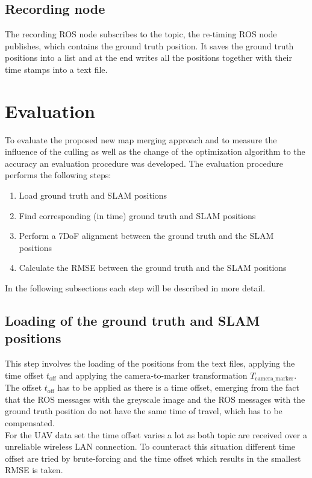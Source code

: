 \subsection{Recording node}
\label{subsec:record_node}
The recording \ac{ROS} node subscribes to the topic, the re-timing \ac{ROS} node publishes, which contains the ground truth position. It saves the ground truth positions into a list and at the end writes all the positions together with their time stamps into a text file.

\section{Evaluation}
To evaluate the proposed new map merging approach and to measure the influence of the culling as well as the change of the optimization algorithm to the accuracy an evaluation procedure was developed. The evaluation procedure performs the following steps:

\begin{enumerate}
  \item Load ground truth and \ac{SLAM} positions
  \item Find corresponding (in time) ground truth and \ac{SLAM} positions
  \item Perform a 7DoF alignment between the ground truth and the \ac{SLAM} positions
  \item Calculate the \acf{RMSE} between the ground truth and the \ac{SLAM} positions
\end{enumerate}

In the following subsections each step will be described in more detail.

\subsection{Loading of the ground truth and \ac{SLAM} positions}
This step involves the loading of the positions from the text files, applying the time offset $t_{\text{off}}$ and applying the camera-to-marker transformation $T_{\text{camera\_marker}}$.\\

The offset $t_{\text{off}}$ has to be applied as there is a time offset, emerging from the fact that the \ac{ROS} messages with the greyscale image and the \ac{ROS} messages with the ground truth position do not have the same time of travel, which has to be compensated.\\
For the \ac{UAV} data set the time offset varies a lot as both topic are received over a unreliable wireless LAN connection. To counteract this situation different time offset are tried by brute-forcing and the time offset which results in the smallest \ac{RMSE} is taken.\\ 

